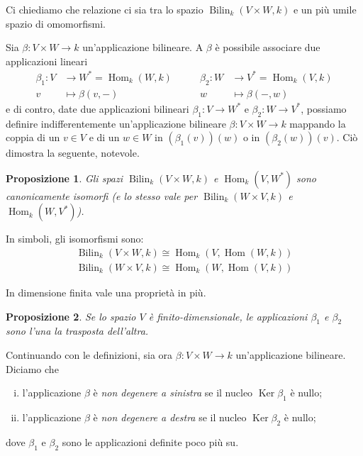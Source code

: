 \documentclass[a4paper]{amsproc}
\theoremstyle{plain}
\newtheorem{prp}{Proposizione}[section]
\theoremstyle{definition}
\theoremstyle{remark}
\DeclareMathOperator{\Ker}{Ker} %
\DeclareMathOperator{\Hom}{Hom}
\DeclareMathOperator{\Bilin}{Bilin}
\begin{document}
Ci chiediamo che relazione ci sia tra lo spazio $ \Bilin_k(V\times W,k) $ e un più umile spazio di omomorfismi.

Sia $ \beta\colon V\times W\to k $ un'applicazione bilineare. A $ \beta $ è possibile associare due applicazioni lineari
\[
  \begin{aligned}
    \beta_1\colon V &\to W^* = \Hom_k(W,k)\\
    v &\mapsto\beta(v,{-})
  \end{aligned}
  \qquad
  \begin{aligned}
    \beta_2\colon W &\to V^* = \Hom_k(V,k)\\
    w &\mapsto\beta({-},w)
  \end{aligned}
\]
e di contro, date due applicazioni bilineari $ \beta_1\colon V\to W^* $ e $ \beta_2\colon W\to V^* $, possiamo definire indifferentemente un'applicazione bilineare $ \beta\colon V\times W\to k $  mappando la coppia di un $ v\in V $ e di un $ w\in W $ in $ \left(\beta_1(v)\right)(w) $ o in $ \left(\beta_2(w)\right)(v) $. Ciò dimostra la seguente, notevole.

\begin{prp}
  Gli spazi $ \Bilin_k(V\times W,k) $ e $ \Hom_k(V,W^*) $ sono canonicamente isomorfi (e lo stesso vale per $ \Bilin_k(W\times V,k) $ e $ \Hom_k(W,V^*) $).
\end{prp}

In simboli, gli isomorfismi sono:
\[
  \begin{aligned}
    \Bilin_k(V\times W,k)\cong\Hom_k(V,\Hom(W,k))\\
    \Bilin_k(W\times V,k)\cong\Hom_k(W,\Hom(V,k))
  \end{aligned}
\]

In dimensione finita vale una proprietà in più.

\begin{prp}
  Se lo spazio $ V $ è finito-dimensionale, le applicazioni $ \beta_1 $ e $ \beta_2 $ sono l'una la trasposta dell'altra.
\end{prp}


Continuando con le definizioni, sia ora $ \beta\colon V\times W\to k $ un'applicazione bilineare. Diciamo che
\begin{enumerate}[(i)]
\item l'applicazione $ \beta $ è \emph{non degenere a sinistra} se il nucleo $ \Ker\beta_1 $ è nullo;
\item l'applicazione $ \beta $ è \emph{non degenere a destra} se il nucleo $ \Ker\beta_2 $ è nullo;
\end{enumerate}
dove $ \beta_1 $ e $ \beta_2 $ sono le applicazioni definite poco più su.
\end{document}
